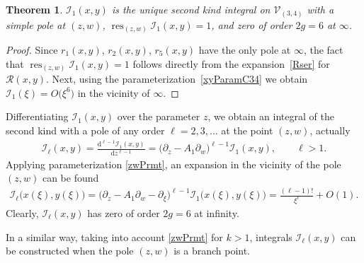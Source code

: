\documentclass[pdftex]{sigma}
\numberwithin{equation}{section}
\newtheorem{Theorem}{Theorem}[section]
\DeclareMathOperator{\res}{res}
\newcommand{\rmd}{\mathrm{d}}
\begin{document}
\begin{Theorem} $\mathcal{I}_1(x,y)$ is the unique second kind integral on $\mathcal{V}_{(3,4)}$ with a simple pole at $(z,w)$, $\res_{(z,w)} \mathcal{I}_1(x,y) = 1$, and zero of order $2g=6$ at $\infty$.
\end{Theorem}
\begin{proof} Since $r_1(x,y)$, $r_2(x,y)$, $r_5(x,y)$ have the only pole at $\infty$, the fact that $\res_{(z,w)} \mathcal{I}_1(x,y) = 1$ follows directly from the expansion~\eqref{Rser} for $\mathcal{R}(x,y)$. Next, using the parameterization~\eqref{xyParamC34} we obtain $\mathcal{I}_1(\xi) = O\big(\xi^6\big)$ in the vicinity of $\infty$.
\end{proof}

Differentiating $\mathcal{I}_1(x,y)$ over the parameter $z$, we obtain an integral of the second kind with a pole of any order $\ell=2,3,\dots$ at the point $(z,w)$, actually
\begin{gather*}
 \mathcal{I}_{\ell}(x,y)=\frac{\rmd^{\ell-1} \mathcal{I}_1(x,y)}{\rmd z^{\ell-1}} = \big(\partial_z - A_1 \partial_w \big)^{\ell-1} \mathcal{I}_1(x,y),\qquad \ell>1.
\end{gather*}
Applying parameterization \eqref{zwPrmt}, an expansion in the vicinity of the pole $(z,w)$ can be found
\begin{gather*}
 \mathcal{I}_{\ell} \big(x(\xi),y(\xi)\big) = \big(\partial_z - A_1 \partial_w - \partial_\xi\big)^{\ell-1}
 \mathcal{I}_1 \big(x(\xi),y(\xi)\big) = \frac{(\ell-1)!}{\xi^\ell} + O(1).
\end{gather*}
Clearly, $\mathcal{I}_\ell(x,y)$ has zero of order $2g=6$ at infinity.

In a similar way, taking into account \eqref{zwPrmt} for $k>1$, integrals $\mathcal{I}_\ell(x,y)$ can be constructed when the pole $(z,w)$ is a branch point.
\end{document}

